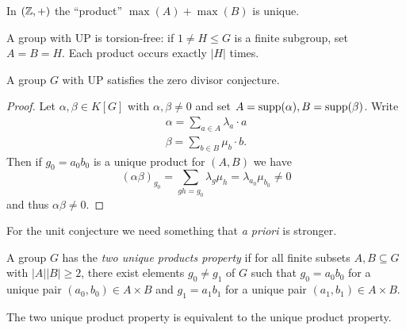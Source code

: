 \begin{example}
    In $(\mathbb{Z}, +)$ the ``product'' $\max(A) + \max(B)$ is unique.
\end{example}

\begin{remark}
    A group with UP is torsion-free: if $1 \neq H \leq G$ is a finite subgroup, set $A = B = H$.
    Each product occurs exactly $|H|$ times.
\end{remark}

\begin{proposition}
    A group $G$ with UP satisfies the zero divisor conjecture.
\end{proposition}

\begin{proof}
    Let $\alpha, \beta \in K[G]$ with $\alpha, \beta \neq 0$ and set $A = \operatorname{supp}(\alpha), B = \operatorname{supp}(\beta)$.
    Write
    \begin{align*}
        \alpha = \sum_{a \in A} \lambda_a \cdot a \\
        \beta = \sum_{b \in B} \mu_b \cdot b.
    \end{align*}
    Then if $g_0 = a_0 b_0$ is a unique product for $(A, B)$ we have \[
        (\alpha \beta)_{g_0} = \sum_{gh = g_0} \lambda_g \mu_h = \lambda_{a_0} \mu_{b_0} \neq 0
    \] and thus $\alpha \beta \neq 0$.
\end{proof}

For the unit conjecture we need something that \emph{a priori} is stronger.

\begin{definition}
    A group $G$ has the \emph{two unique products property} if for all finite subsets $A, B \subseteq G$ with $|A| |B| \geq 2$, there exist elements $g_0 \neq g_1$ of $G$ such that $g_0 = a_0 b_0$ for a unique pair $(a_0, b_0) \in A \times B$ and $g_1 = a_1 b_1$ for a unique pair $(a_1, b_1) \in A \times B$.
\end{definition}

\begin{proposition}[Strojnowski]
    The two unique product property is equivalent to the unique product property.
\end{proposition}

